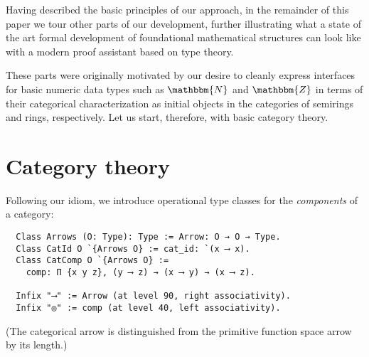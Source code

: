 \documentclass[a4paper,10pt,runningheads]{llncs}
\newcommand{\N}{\ensuremath{\mathbbm{N}}}
\newcommand{\Z}{\ensuremath{\mathbbm{Z}}}
\begin{document}
% 

Having described the basic principles of our approach, in the remainder of this paper we tour other parts of our development, further illustrating what a state of the art formal development of foundational mathematical structures can look like with a modern proof assistant based on type theory.

These parts were originally motivated by our desire to cleanly express interfaces for basic numeric data types such as $\N$ and $\Z$ in terms of their categorical characterization as initial objects in the categories of semirings and rings, respectively. Let us start, therefore, with basic category theory.

\section{Category theory}\label{cat}

Following our idiom, we introduce operational type classes for the \emph{components} of a category:
\begin{lstlisting}
  Class Arrows (O: Type): Type := Arrow: O → O → Type.
  Class CatId O `{Arrows O} := cat_id: `(x ⟶ x).
  Class CatComp O `{Arrows O} :=
    comp: Π {x y z}, (y ⟶ z) → (x ⟶ y) → (x ⟶ z).

  Infix "⟶" := Arrow (at level 90, right associativity).
  Infix "◎" := comp (at level 40, left associativity).
\end{lstlisting}
(The categorical arrow is distinguished from the primitive function space arrow by its length.)
\end{document}
